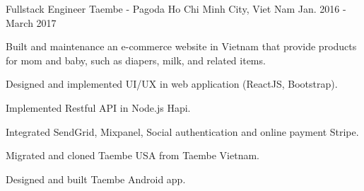 

\begin{cventries}

  \cventry
    {Fullstack Engineer} %
    {Taembe - Pagoda}
    {Ho Chi Minh City, Viet Nam} %
    {Jan. 2016 - March 2017} %
    {
      \begin{cvitems} %
        \item {Built and maintenance an e-commerce website in Vietnam that provide products for mom and baby, such as diapers, milk, and related items.}
        \item {Designed and implemented UI/UX in web application (ReactJS, Bootstrap).}
        \item {Implemented Restful API in Node.js Hapi.}
        \item {Integrated SendGrid, Mixpanel, Social authentication and online payment Stripe.}
        \item {Migrated and cloned Taembe USA from Taembe Vietnam.}
        \item {Designed and built Taembe Android app.}
      \end{cvitems}
    }


\end{cventries}
